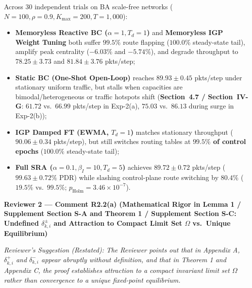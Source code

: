 \documentclass[11pt,a4paper]{article}
\newcommand{\cbox}[2]{%
  \vspace{0.6em}\noindent\textbf{#1}\par\smallskip
  \noindent\textit{Reviewer's Suggestion (Restated):} \textit{#2}\par\smallskip
}
\begin{document}
\begin{enumerate}[leftmargin=1.8em]
    Across 30 independent trials on BA scale-free networks ($N=100, \rho=0.9, K_{\max}=200, T=1{,}000$):
    \begin{itemize}
        \item \textbf{Memoryless Reactive BC ($\alpha=1, T_d=1$)} and \textbf{Memoryless IGP Weight Tuning} both suffer $99.5\%$ route flapping ($100.0\%$ steady-state tail), amplify peak centrality ($-6.03\%$ and $-5.74\%$), and degrade throughput to $78.25 \pm 3.73$ and $81.84 \pm 3.76$ pkts/step;
        \item \textbf{Static BC (One-Shot Open-Loop)} reaches $89.93 \pm 0.45$ pkts/step under stationary uniform traffic, but stalls when capacities are bimodal/heterogeneous or traffic hotspots shift (\textbf{Section~4.7 / Section~IV-G}: $61.72$ vs.\ $66.99$ pkts/step in Exp-2(a), $75.03$ vs.\ $86.13$ during surge in Exp-2(b));
        \item \textbf{IGP Damped FT (EWMA, $T_d=1$)} matches stationary throughput ($90.06 \pm 0.34$ pkts/step), but still switches routing tables at \textbf{$99.5\%$ of control epochs} ($100.0\%$ steady-state tail);
        \item \textbf{Full SRA ($\alpha=0.1, \beta_I=10, T_d=5$)} achieves $89.72 \pm 0.72$ pkts/step ($99.63 \pm 0.72\%$ PDR) while slashing control-plane route switching by \textbf{$80.4\%$} ($19.5\%$ vs.\ $99.5\%$; $p_{\text{Holm}}=3.46 \times 10^{-7}$).
    \end{itemize}
\end{enumerate}

\hrulefill

\cbox{Reviewer 2 --- Comment R2.2(a) (Mathematical Rigor in Lemma 1 / Supplement Section S-A and Theorem 1 / Supplement Section S-C: Undefined $\delta^\pm_{k,i}$ and Attraction to Compact Limit Set $\Omega$ vs.\ Unique Equilibrium)}{The Reviewer points out that in Appendix A, $\delta^+_{k,i}$ and $\delta^-_{k,i}$ appear abruptly without definition, and that in Theorem 1 and Appendix C, the proof establishes attraction to a compact invariant limit set $\Omega$ rather than convergence to a unique fixed-point equilibrium.}
\end{document}
